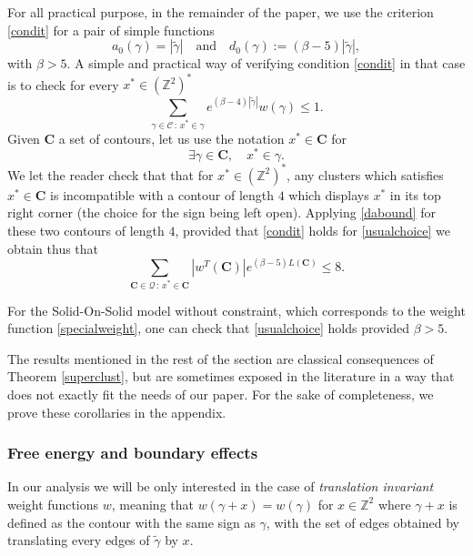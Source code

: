 \documentclass[10pt]{amsart}
\let\mathcal\mathscr
\newcommand{\sep}{\,:\,}
\numberwithin{equation}{section}
\theoremstyle{plain}
\theoremstyle{definition}
\newcommand{\cQ}{{\ensuremath{\mathcal Q}} }
\newcommand{\cC}{{\ensuremath{\mathcal C}} }
\newcommand{\bC}{{\ensuremath{\mathbf C}} }
\newcommand{\bbZ}{{\ensuremath{\mathbb Z}} }
\newcommand{\gb}{\beta}
\begin{document}
For all practical purpose, in the remainder of the paper, we use the criterion \eqref{condit} for a pair of simple functions\vspace*{-3pt}
\[
a_0(\gamma)=|\tilde \gamma| \quad\text{and}\quad d_0(\gamma):= \left(\gb-5\right) |\tilde \gamma|,
\]
with $\gb>5$.
A simple and practical way of verifying condition \eqref{condit} in that case is to check for every $x^*\in (\bbZ^2)^*$\vspace*{-3pt}
\begin{equation}\label{usualchoice}
\sum_{\gamma\in \cC \sep x^*\in \gamma} e^{(\gb-4)|\tilde \gamma|} w(\gamma)\le 1.
\end{equation}
Given $\bC$ a set of contours, let us use the notation $x^*\in \bC$ for
\begin{equation*}
\exists \gamma \in \bC, \quad x^*\in\gamma.
\end{equation*}
We let the reader check that
that for $x^*\in (\bbZ^2)^*$, any clusters which satisfies $x^*\in \bC$ is incompatible with a contour of length $4$ which displays $x^*$ in its top right corner
(the choice for the sign being left open).
Applying \eqref{dabound} for these two contours of length $4$, provided that \eqref{condit} holds for \eqref{usualchoice}
we obtain thus that
\begin{equation}\label{dabound2}
\sum_{ \bC\in \cQ \sep x^*\in \bC } |w^T(\bC)|e^{(\gb-5)L(\bC)} \le 8.
\end{equation}

For the Solid-On-Solid model without constraint, which corresponds to the weight function \eqref{specialweight},
one can check that
\eqref{usualchoice} holds provided $\gb>5$.

The results mentioned in the rest of the section are classical consequences of Theorem \ref{superclust},
but are sometimes exposed in the literature in a way that does not exactly fit the needs of our paper.
For the sake of completeness, we prove these corollaries in the appendix.

\subsubsection{Free energy and boundary effects}\label{fffa}
In our analysis we will be only interested in the case of \textit{translation invariant} weight functions $w$,
meaning that $w(\gamma+x)=w(\gamma)$ for $x\in \bbZ^2$ where $\gamma+x$ is defined as the contour with the same sign as $\gamma$,
with the set of edges obtained by translating every edges of
$\tilde\gamma$ by $x$.
\end{document}
